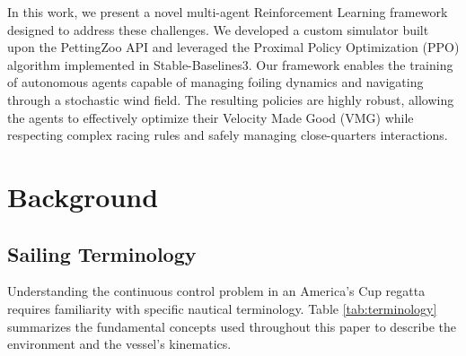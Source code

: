 \documentclass{article}
\begin{document}
In this work, we present a novel multi-agent Reinforcement Learning framework designed to address these challenges. We developed a custom simulator built upon the PettingZoo API and leveraged the Proximal Policy Optimization (PPO) algorithm implemented in Stable-Baselines3. Our framework enables the training of autonomous agents capable of managing foiling dynamics and navigating through a stochastic wind field. The resulting policies are highly robust, allowing the agents to effectively optimize their Velocity Made Good (VMG) while respecting complex racing rules and safely managing close-quarters interactions.

\section{Background}

\subsection{Sailing Terminology}
Understanding the continuous control problem in an America's Cup regatta requires familiarity with specific nautical terminology. Table \ref{tab:terminology} summarizes the fundamental concepts used throughout this paper to describe the environment and the vessel's kinematics.
\end{document}
